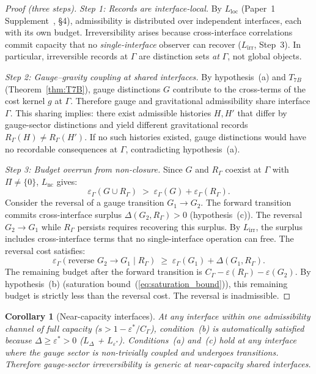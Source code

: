 \documentclass[11pt]{article}
\newtheorem{corollary}[theorem]{Corollary}
\theoremstyle{definition}
\begin{document}
\begin{proof}[Proof (three steps)]

\textit{Step 1: Records are interface-local.}\quad
By $L_{\mathrm{loc}}$ (Paper~1 Supplement~\cite{BrookeSupplement}, \S4), admissibility
is distributed over independent interfaces, each with its own budget.
Irreversibility arises because cross-interface correlations commit
capacity that no \emph{single-interface} observer can recover
($L_{\mathrm{irr}}$, Step~3).  In particular, irreversible records at
$\Gamma$ are distinction sets \emph{at} $\Gamma$, not global objects.

\textit{Step 2: Gauge--gravity coupling at shared interfaces.}\quad
By hypothesis~(a) and $T_{7B}$ (Theorem~\ref{thm:T7B}), gauge
distinctions $G$ contribute to the cross-terms of the cost kernel $g$
at $\Gamma$.  Therefore gauge and gravitational admissibility share
interface $\Gamma$.  This sharing implies: there exist admissible
histories $H, H'$ that differ by gauge-sector distinctions and yield
different gravitational records $R_\Gamma(H) \ne R_\Gamma(H')$.  If
no such histories existed, gauge distinctions would have no recordable
consequences at $\Gamma$, contradicting hypothesis~(a).

\textit{Step 3: Budget overrun from non-closure.}\quad
Since $G$ and $R_\Gamma$ coexist at $\Gamma$ with $\Pi \ne \{0\}$,
$L_{\mathrm{nc}}$ gives:
\[
  \varepsilon_\Gamma(G \cup R_\Gamma)
  \;>\;
  \varepsilon_\Gamma(G) + \varepsilon_\Gamma(R_\Gamma).
\]
Consider the reversal of a gauge transition $G_1 \to G_2$.  The
forward transition commits cross-interface surplus
$\Delta(G_2, R_\Gamma) > 0$ (hypothesis~(c)).  The reversal
$G_2 \to G_1$ while $R_\Gamma$ persists requires recovering this
surplus.  By $L_{\mathrm{irr}}$, the surplus includes cross-interface
terms that no single-interface operation can free.  The reversal cost
satisfies:
\[
  \varepsilon_\Gamma(\text{reverse } G_2 \to G_1 \mid R_\Gamma)
  \;\ge\;
  \varepsilon_\Gamma(G_1) + \Delta(G_1, R_\Gamma).
\]
The remaining budget after the forward transition is
$C_\Gamma - \varepsilon(R_\Gamma) - \varepsilon(G_2)$.  By
hypothesis~(b) (saturation bound~(\ref{eq:saturation_bound})),
this remaining budget is strictly less than the reversal cost.
The reversal is inadmissible.
\end{proof}

\begin{corollary}[Near-capacity interfaces]
At any interface within one admissibility channel of full capacity
($s > 1 - \varepsilon^*/C_\Gamma$), condition~(b) is automatically
satisfied because $\Delta \ge \varepsilon^* > 0$ ($L_\Delta$ +
$L_{\varepsilon^*}$).  Conditions~(a) and~(c) hold at any interface
where the gauge sector is non-trivially coupled and undergoes
transitions.  Therefore gauge-sector irreversibility is generic at
near-capacity shared interfaces.
\end{corollary}
\end{document}
